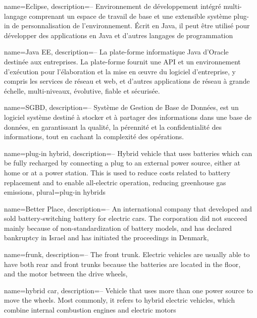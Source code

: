 
{
  name=Eclipse,
  description={-- Environnement de développement intégré multi-langage comprenant un espace de travail de base et une extensible système plug-in de personnalisation de l'environnement. Écrit en Java, il peut être utilisé pour développer des applications en Java et d'autres langages de programmation}
}

{
  name=Java EE,
  description={-- La plate-forme informatique Java d'Oracle destinée aux entreprises. La plate-forme fournit une API et un environnement d'exécution pour l'élaboration et la mise en œuvre du logiciel d'entreprise, y compris les services de réseau et web, et d'autres applications de réseau à grande échelle, multi-niveaux, évolutive, fiable et sécurisée.}
}

{
  name=SGBD,
  description={-- Système de Gestion de Base de Données, est un logiciel système destiné à stocker et à partager des informations dans une base de données, en garantissant la qualité, la pérennité et la confidentialité des informations, tout en cachant la complexité des opérations.}
}

{
  name=plug-in hybrid,
  description={-- Hybrid vehicle that uses batteries which can be fully recharged by connecting a plug to an external power source, either at home or at a power station. This is used to reduce costs related to battery replacement and to enable all-electric operation, reducing greenhouse gas emissions},
  plural=plug-in hybrids
}

{
  name=Better Place,
  description={-- An international company that developed and sold battery-switching battery for electric cars. The corporation did not succeed mainly because of non-standardization of battery models, and has declared bankruptcy in Israel and has initiated the proceedings in Denmark},
}


{
  name=frunk,
  description={-- The front trunk. Electric vehicles are usually able to have both rear and front trunks because the batteries are located in the floor, and the motor between the drive wheels},
}

{
	name=hybrid car,
	description={-- Vehicle that uses more than one power source to move the wheels. Most commonly, it refers to hybrid electric vehicles, which combine internal combustion engines and electric motors}
}

